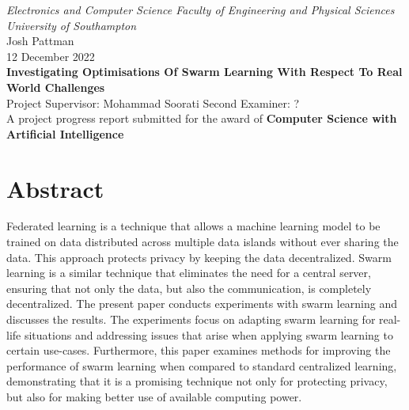 \documentclass[12pt,a4paper,titlepage]{report}
\begin{document}
	\begin{titlepage}
		\centering\Large\emph{Electronics and Computer Science Faculty of Engineering and Physical Sciences University of Southampton}
		\\[3cm]
		\centering\Large{Josh Pattman} \\
		\centering\Large{12 December 2022} \\
		\centering\huge\textbf{Investigating Optimisations Of Swarm Learning With Respect To Real World Challenges}
		\\[4cm]
		\centering\Large{Project Supervisor: Mohammad Soorati}
		\centering\Large{Second Examiner: ?}
		\\[3cm]
		\centering\Large{A project progress report submitted for the award of \textbf{Computer Science with Artificial Intelligence}}
	\end{titlepage}


	\chapter*{Abstract}	
	Federated learning is a technique that allows a machine learning model to be trained on data distributed across multiple data islands without ever sharing the data. This approach protects privacy by keeping the data decentralized. Swarm learning is a similar technique that eliminates the need for a central server, ensuring that not only the data, but also the communication, is completely decentralized. The present paper conducts experiments with swarm learning and discusses the results. The experiments focus on adapting swarm learning for real-life situations and addressing issues that arise when applying swarm learning to certain use-cases. Furthermore, this paper examines methods for improving the performance of swarm learning when compared to standard centralized learning, demonstrating that it is a promising technique not only for protecting privacy, but also for making better use of available computing power.

	\tableofcontents
	
	
	
	
	
	
	{}
\end{document}
